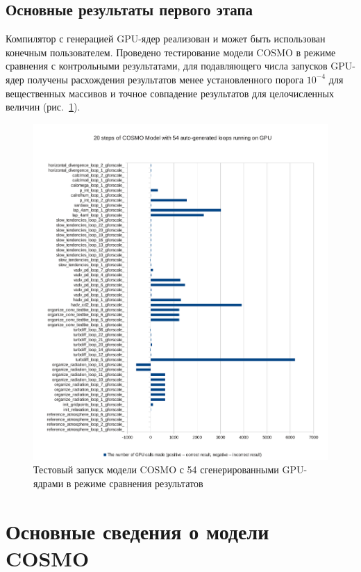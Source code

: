 \documentclass[a4,12pt]{report}
\begin{document}
\section{Основные результаты первого этапа}

Компилятор с генерацией GPU-ядер реализован и может быть использован конечным пользователем. Проведено тестирование модели COSMO в режиме сравнения с контрольными результатами, для подавляющего числа запусков GPU-ядер получены расхождения результатов менее установленного порога $10^{-4}$ для вещественных массивов и точное совпадение результатов для целочисленных величин (рис.~\ref{fig:compare}).

\begin{figure}
\centering
\includegraphics[scale=0.7]{cosmo_20-54_test}
\caption{Тестовый запуск модели COSMO с 54 сгенерированными GPU-ядрами в режиме сравнения результатов}
\label{fig:compare}
\end{figure}

\chapter{Основные сведения о модели COSMO}
\end{document}
